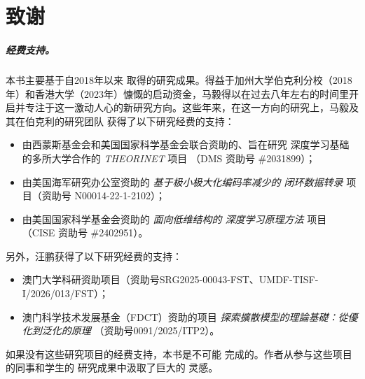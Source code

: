\documentclass[../../book-main_zh.tex]{subfiles}
\begin{document}
\chapter*{致谢}

\paragraph{经费支持。}
本书主要基于自2018年以来
取得的研究成果。得益于加州大学伯克利分校（2018年）和香港大学（2023年）慷慨的启动资金，马毅得以在过去八年左右的时间里开启并专注于这一激动人心的新研究方向。这些年来，在这一方向的研究上，马毅及其在伯克利的研究团队
获得了以下研究经费的支持：
\begin{itemize}
    \item 由西蒙斯基金会和美国国家科学基金会联合资助的、旨在研究
        深度学习基础的多所大学合作的 {\em THEORINET} 项目
        （DMS 资助号 \#2031899）；
    \item 由美国海军研究办公室资助的 {\em 基于极小极大化编码率减少的
        闭环数据转录} 项目（资助号
        N00014-22-1-2102）；
    \item 由美国国家科学基金会资助的 {\em 面向低维结构的
        深度学习原理方法} 项目
        （CISE 资助号 \#2402951）。
\end{itemize}

另外，汪鹏获得了以下研究经费的支持：
\begin{itemize}
    \item 澳门大学科研资助项目（资助号SRG2025-00043-FST、UMDF-TISF-I/2026/013/FST）；
    
    \item 澳门科学技术发展基金（FDCT）资助的项目 {\em 探索擴散模型的理論基礎：從優化到泛化的原理} （资助号0091/2025/ITP2）。
\end{itemize}
 

如果没有这些研究项目的经费支持，本书是不可能
完成的。作者从参与这些项目的同事和学生的
研究成果中汲取了巨大的
灵感。
\end{document}
